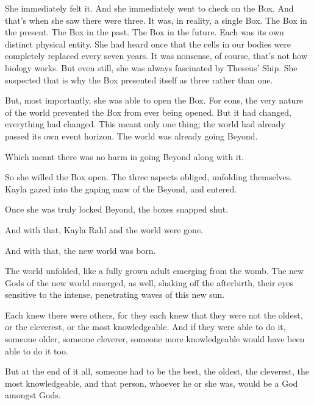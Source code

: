 She immediately felt it. And she immediately went to check on the Box. And that’s when she saw there were three. It was, in reality, a single Box. The Box in the present. The Box in the past. The Box in the future. Each was its own distinct physical entity. She had heard once that the cells in our bodies were completely replaced every seven years. It was nonsense, of course, that’s not how biology works. But even still, she was always fascinated by Theseus’ Ship. She suspected that is why the Box presented itself as three rather than one.

But, most importantly, she was able to open the Box. For eons, the very nature of the world prevented the Box from ever being opened. But it had changed, everything had changed. This meant only one thing; the world had already passed its own event horizon. The world was already going Beyond.

Which meant there was no harm in going Beyond along with it.

So she willed the Box open. The three aspects obliged, unfolding themselves. Kayla gazed into the gaping maw of the Beyond, and entered.

Once she was truly locked Beyond, the boxes snapped shut.

And with that, Kayla Rahl and the world were gone.

And with that, the new world was born.

The world unfolded, like a fully grown adult emerging from the womb. The new Gods of the new world emerged, as well, shaking off the afterbirth, their eyes sensitive to the intense, penetrating waves of this new sun.

Each knew there were others, for they each knew that they were not the oldest, or the cleverest, or the most knowledgeable. And if they were able to do it, someone older, someone cleverer, someone more knowledgeable would have been able to do it too.

But at the end of it all, someone had to be the best, the oldest, the cleverest, the most knowledgeable, and that person, whoever he or she was, would be a God amongst Gods.